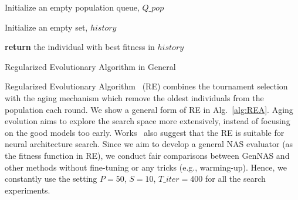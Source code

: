\documentclass{article}
\begin{document}
\begin{algorithm}[]
\small
\SetAlgoLined


 Initialize an empty population queue, $Q\_pop$ 
 
 Initialize an empty set, $history$ 
 
 
 
 \textbf{return} the individual with best fitness in $history$
\caption{\label{alg:REA} Regularized Evolutionary Algorithm in  General}
\end{algorithm}

Regularized Evolutionary Algorithm~\cite{real2019regularized} (RE) combines the tournament selection~\cite{goldberg1991comparative} with the aging mechanism which remove the oldest individuals from the population each round. We show a general form of RE in Alg.~\ref{alg:REA}. Aging evolution aims to explore the search space more extensively, instead of focusing on the good models too early. Works~\cite{dong2020bench,ying2019bench,chen2019renas} also suggest that the RE is suitable for neural architecture search. Since we aim to develop a general NAS evaluator (as the fitness function in RE), we conduct fair comparisons between GenNAS and other methods without fine-tuning or any tricks (e.g., warming-up). Hence, we constantly use the setting $P = 50$, $S = 10$, $T\_iter = 400$ for all the search experiments.
\end{document}
